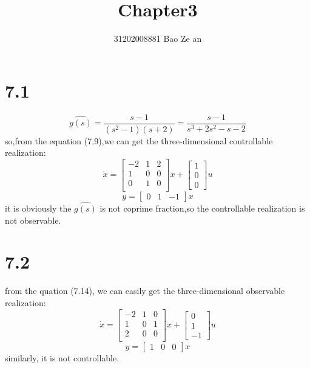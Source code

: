 \documentclass{article}
\title{Chapter3}
\author{31202008881        \quad \quad \quad
          Bao Ze an}
\begin{document}
\setlength{\parindent}{0em}
\maketitle

\section*{7.1}
\[\hat{g(s)}=\frac{s-1}{(s^2-1)(s+2)}=\frac{s-1}{s^3+2s^2-s-2}\]
so,from the equation (7.9),we can get the three-dimensional controllable realization:\\
\[
\dot{x}=
\left[
\begin{array}{ccc}
-2 & 1 & 2\\
1 & 0 & 0\\
0 & 1 & 0\\
\end{array}    
\right]x+
\left[
    \begin{array}{c}
    1\\
    0\\
    0
    \end{array}
\right]u
\]
\[
    y=\left[
        \begin{array}{ccc}
            0 & 1 & -1
        \end{array}
        \right]x    
\]
it is obviously the $\hat{g(s)}$ is not coprime fraction,so the controllable realization is not observable.

\section*{7.2}
from the quation (7.14), we can easily get the three-dimensional observable realization:\\
\[
\dot{x}=
\left[
\begin{array}{ccc}
-2 & 1 & 0\\
1 & 0 & 1\\
2 & 0 & 0\\
\end{array}    
\right]x+
\left[
    \begin{array}{c}
    0\\
    1\\
    -1
    \end{array}
\right]u
\]
\[
    y=\left[
        \begin{array}{ccc}
            1 & 0 & 0
        \end{array}
        \right]x    
\]
similarly, it is not controllable.
\end{document}
